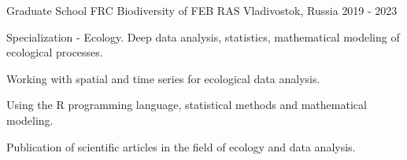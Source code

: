 

\begin{cventries}

  
  \cventry
    {Graduate School} %
    {FRC Biodiversity of FEB RAS} %
    {Vladivostok, Russia} %
    {2019 - 2023} %
    {
      \begin{cvitems}
        \item {Specialization - Ecology. Deep data analysis, statistics, mathematical modeling of ecological processes.}
        \item {Working with spatial and time series for ecological data analysis.}
        \item {Using the R programming language, statistical methods and mathematical modeling.}
        \item {Publication of scientific articles in the field of ecology and data analysis.}
      \end{cvitems}
    }

\end{cventries}



